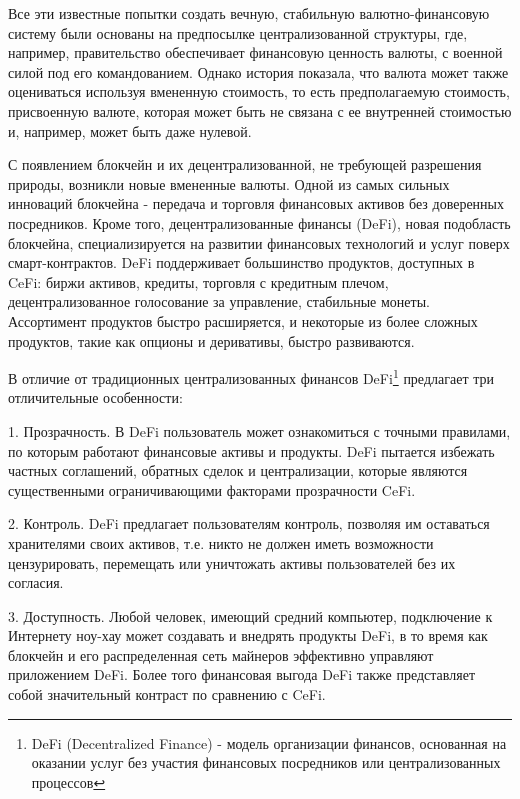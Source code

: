 \documentclass[14pt, a4paper]{extarticle}
\begin{document}
Все эти известные попытки создать вечную, стабильную валютно-финансовую систему были основаны на предпосылке централизованной структуры, где, например, правительство обеспечивает финансовую ценность валюты, с военной силой под его командованием.
Однако история показала, что валюта может также оцениваться используя вмененную стоимость, то есть предполагаемую стоимость, присвоенную валюте, которая может быть не связана с ее внутренней стоимостью и, например, может быть даже нулевой.

С появлением блокчейн и их децентрализованной, не требующей разрешения природы, возникли новые вмененные валюты. Одной из самых сильных инноваций блокчейна - передача и торговля финансовых активов без доверенных посредников. Кроме того, децентрализованные финансы (DeFi), новая подобласть блокчейна, специализируется на развитии финансовых технологий и услуг поверх смарт-контрактов. DeFi поддерживает большинство продуктов, доступных в CeFi: биржи активов, кредиты, торговля с кредитным плечом, децентрализованное голосование за управление, стабильные монеты. Ассортимент продуктов быстро расширяется, и некоторые из более сложных продуктов, такие как опционы и деривативы, быстро развиваются.


В отличие от традиционных централизованных финансов DeFi\footnote{DeFi (Decentralized Finance) - модель организации финансов, основанная на оказании услуг без участия финансовых посредников или централизованных процессов} предлагает три отличительные особенности:

1. Прозрачность. В DeFi пользователь может ознакомиться с точными правилами, по которым работают финансовые активы и продукты. DeFi пытается избежать частных соглашений, обратных сделок и централизации, которые являются 
существенными ограничивающими факторами прозрачности CeFi.

2. Контроль. DeFi предлагает пользователям контроль, позволяя им оставаться хранителями своих активов, т.е. никто не должен иметь возможности цензурировать, перемещать или уничтожать активы пользователей без их согласия. 

3. Доступность. Любой человек, имеющий средний компьютер, подключение к Интернету ноу-хау может создавать и внедрять продукты DeFi, в то время как блокчейн и его распределенная сеть майнеров эффективно управляют приложением DeFi. Более того финансовая выгода DeFi также представляет собой значительный контраст по сравнению с CeFi.
\end{document}
